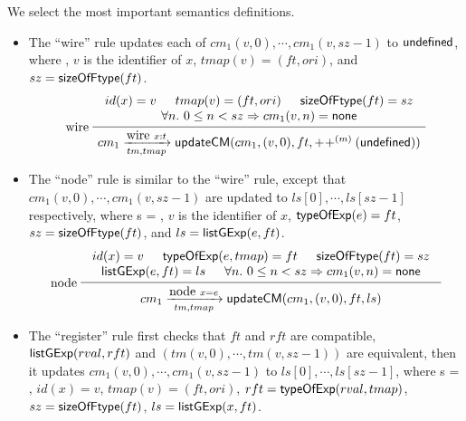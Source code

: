 We select the most important semantics definitions. %
\begin{itemize}
	\item The ``wire'' rule updates each of $cm_1(v, 0), \cdots, cm_1(v, sz-1)$ to ${\sf undefined}$, where ,  $v$ is the identifier of $x$, $tmap(v) = (ft, ori)$, and $sz= {\sf sizeOfFtype}(ft)$.
	\[
		\infer[wire]
	{\seqq{cm_1 \xrightarrow[tm, tmap]{\mbox{wire } x: t} \updatecm(cm_1, (v, 0), ft, %
			\conc{m}(\svundefined)		
			)}}
	{
		\begin{array}{c}
			id(x) = v \hspace{15pt} tmap(v)= (ft, ori) \hspace{15pt} \sizeofftype(ft) = sz \\
			\forall n.\ 0 \le n < sz \Rightarrow cm_1(v, n) = \svnone
		\end{array}
	}
	\]
	\item The ``node'' rule is similar to the ``wire'' rule, except that $cm_1(v, 0), \cdots, cm_1(v, sz-1)$ are updated to $ls[0], \cdots, ls[sz-1]$ respectively, where s = , $v$ is the identifier of $x$, ${\sf typeOfExp}(e) = ft$, $sz= {\sf sizeOfFtype}(ft)$, and $ls = {\sf listGExp}(e, ft)$.
	\[
			\infer[node]
	{\seqq{ cm_1 \xrightarrow[tm, tmap]{\mbox{node } x = e}  \updatecm(cm_1, (v, 0), ft, ls)}}
	{
		\begin{array}{c}
			id(x) = v \hspace{15pt} \typeofexp(e, tmap)= ft \hspace{15pt} \sizeofftype(ft) = sz  \\
		 \listgexp(e, ft) = ls	\hspace{15pt} \forall n.\ 0 \le n < sz  \Rightarrow  cm_1(v, n) = \svnone
		\end{array}
	}
	\]
	\item The ``register'' rule first checks that $ft$ and $rft$ are compatible, ${\sf listGExp}(rval, rft)$ and $(tm(v,0), \cdots, tm(v, sz-1))$ are equivalent, then it updates $cm_1(v, 0), \cdots, cm_1(v, sz-1)$ to $ls[0], \cdots, ls[sz-1]$, where s = , $id(x) = v$, $tmap(v) = (ft, ori)$, $rft = {\sf typeOfExp}(rval, tmap)$, $sz = {\sf sizeOfFtype}(ft)$, $ls = {\sf listGExp}(x, ft)$.

\end{itemize}
